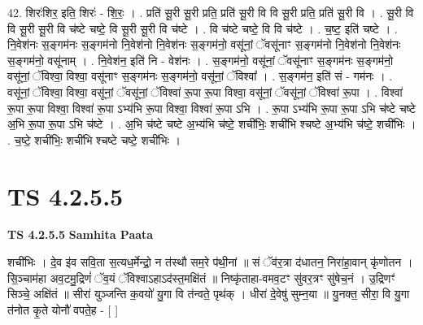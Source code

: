 \documentclass[17pt]{extarticle}
\begin{document}
42. शिरः॑शिर॒ इति॒ शिरः॑ - शि॒रः॒ । . प्रति॑ सू॒री सू॒री प्रति॒ प्रति॑ सू॒री वि वि सू॒री प्रति॒ प्रति॑ सू॒री वि । . सू॒री वि वि सू॒री सू॒री वि च॑ष्टे चष्टे॒ वि सू॒री सू॒री वि च॑ष्टे । . वि च॑ष्टे चष्टे॒ वि वि च॑ष्टे । . च॒ष्ट॒ इति॑ चष्टे । . नि॒वेश॑नः स॒ङ्गम॑नः स॒ङ्गम॑नो नि॒वेश॑नो नि॒वेश॑नः स॒ङ्गम॑नो॒ वसू॑नां॒ ॅवसू॑नाꣳ स॒ङ्गम॑नो नि॒वेश॑नो नि॒वेश॑नः स॒ङ्गम॑नो॒ वसू॑नाम् । . नि॒वेश॑न॒ इति॑ नि - वेश॑नः । . स॒ङ्गम॑नो॒ वसू॑नां॒ ॅवसू॑नाꣳ स॒ङ्गम॑नः स॒ङ्गम॑नो॒ वसू॑नां॒ ॅविश्वा॒ विश्वा॒ वसू॑नाꣳ स॒ङ्गम॑नः स॒ङ्गम॑नो॒ वसू॑नां॒ ॅविश्वा᳚ । . स॒ङ्गम॑न॒ इति॑ सं - गम॑नः । . वसू॑नां॒ ॅविश्वा॒ विश्वा॒ वसू॑नां॒ ॅवसू॑नां॒ ॅविश्वा॑ रू॒पा रू॒पा विश्वा॒ वसू॑नां॒ ॅवसू॑नां॒ ॅविश्वा॑ रू॒पा । . विश्वा॑ रू॒पा रू॒पा विश्वा॒ विश्वा॑ रू॒पा ऽभ्य॑भि रू॒पा विश्वा॒ विश्वा॑ रू॒पा ऽभि । . रू॒पा ऽभ्य॑भि रू॒पा रू॒पा ऽभि च॑ष्टे चष्टे अ॒भि रू॒पा रू॒पा ऽभि च॑ष्टे । . अ॒भि च॑ष्टे चष्टे अ॒भ्य॑भि च॑ष्टे॒ शची॑भिः॒ शची॑भि श्चष्टे अ॒भ्य॑भि च॑ष्टे॒ शची॑भिः । . च॒ष्टे॒ शची॑भिः॒ शची॑भि श्चष्टे चष्टे॒ शची॑भिः । \newline
\pagebreak
{}

\section{ TS 4.2.5.5 }

\textbf{TS 4.2.5.5 } \newline
\textbf{Samhita Paata} \newline

शची॑भिः । दे॒व इ॑व सवि॒ता स॒त्यध॒र्मेन्द्रो॒ न त॑स्थौ सम॒रे प॑थी॒नां ॥ सं ॅव॑र॒त्रा द॑धातन॒ निरा॑हा॒वान् कृ॑णोतन । सि॒ञ्चाम॑हा अव॒टमु॒द्रिणं॑ ॅव॒यं ॅविश्वाऽहाऽद॑स्त॒मक्षि॑तं ॥ निष्कृ॑ताहा-वमव॒टꣳ सु॑वर॒त्रꣳ सु॑षेच॒नं । उ॒द्रिणꣳ॑ सिञ्चे॒ अक्षि॑तं ॥ सीरा॑ युञ्जन्ति क॒वयो॑ यु॒गा वि त॑न्वते॒ पृथ॑क् । धीरा॑ दे॒वेषु॑ सुम्न॒या ॥ यु॒नक्त॒ सीरा॒ वि यु॒गा त॑नोत कृ॒ते योनौ॑ वपते॒ह - [  ] \newline
\end{document}
